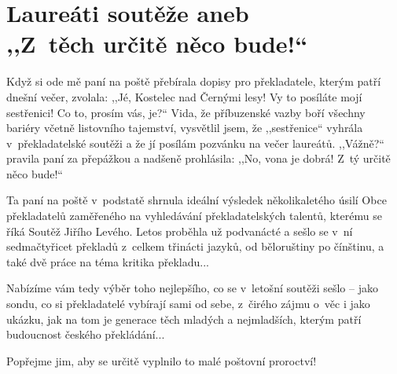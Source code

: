 \section{Laureáti soutěže aneb \\ ,,Z těch určitě něco bude!``}

Když si ode mě paní na poště přebírala dopisy pro překladatele, kterým patří dnešní večer, zvolala: ,,Jé, Kostelec nad Černými lesy! Vy to posíláte mojí sestřenici! Co to, prosím vás, je?`` Vida, že příbuzenské vazby boří všechny bariéry včetně listovního tajemství, vysvětlil jsem, že ,,sestřenice`` vyhrála v překladatelské soutěži a že jí posílám pozvánku na večer laureátů. ,,Vážně?`` pravila paní za přepážkou a nadšeně prohlásila: ,,No, vona je dobrá! Z tý určitě něco bude!``

Ta paní na poště v podstatě shrnula ideální výsledek několikaletého úsilí Obce překladatelů zaměřeného na vyhledávání překladatelských talentů, kterému se říká Soutěž Jiřího Levého. Letos proběhla už podvanácté a sešlo se v ní sedmačtyřicet překladů z celkem třinácti jazyků, od běloruštiny po čínštinu, a také dvě práce na téma kritika překladu... 

Nabízíme vám tedy výběr toho nejlepšího, co se v letošní soutěži sešlo -- jako sondu, co si překladatelé vybírají sami od sebe, z čirého zájmu o~věc i jako ukázku, jak na tom je generace těch mladých a nejmladších, kterým patří budoucnost českého překládání... 

Popřejme jim, aby se určitě vyplnilo to malé poštovní proroctví!

